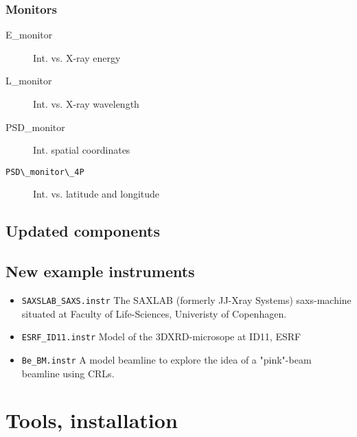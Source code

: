 \subsubsection*{Monitors}
\begin{description}
\item[E\_monitor] Int. vs. X-ray energy
\item[L\_monitor] Int. vs. X-ray wavelength
\item[PSD\_monitor] Int. spatial coordinates
\item[\verb+PSD\_monitor\_4P+] Int. vs. latitude and longitude
\end{description}

\subsection{Updated components}

\subsection{New example instruments}


\begin{itemize}
\item \verb+SAXSLAB_SAXS.instr+ The SAXLAB (formerly JJ-Xray Systems) saxs-machine situated at Faculty of Life-Sciences, Univeristy of Copenhagen. 
\item \verb+ESRF_ID11.instr+ Model of the 3DXRD-microsope at ID11, ESRF
\item \verb+Be_BM.instr+ A model beamline to explore the idea of a "pink"-beam beamline using CRLs\cite{vaughan_10}.
\end{itemize}


\section{Tools, installation}
\label{s:new-features:tools}
